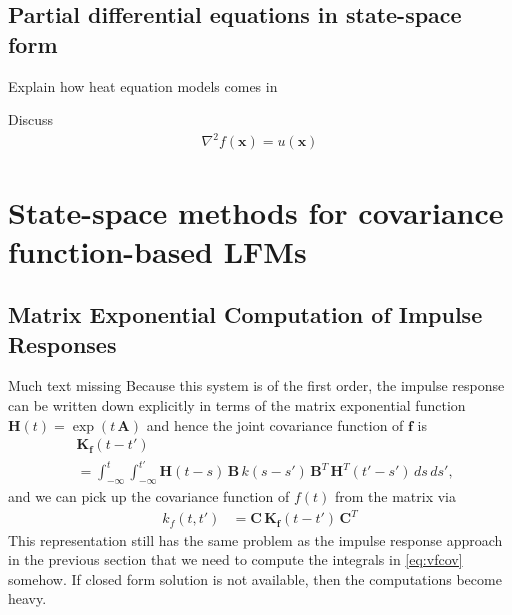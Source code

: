 \documentclass[journal]{IEEEtran}
\newcommand{\simo}[1]{{\color{red}#1}}
\begin{document}
\subsection{Partial differential equations in state-space form}

\simo{Explain how heat equation models comes in}


Discuss
%
\begin{align*}
  \nabla^2 f(\mathbf{x}) = u(\mathbf{x})
\end{align*}


%

\section{State-space methods for covariance function-based LFMs}

\subsection{Matrix Exponential Computation of Impulse Responses}
\simo{Much text missing}
Because this system is of the first order, the impulse response can be written down explicitly in terms of the matrix exponential function $\mathbf{H}(t) = \exp(t \, \mathbf{A})$ and hence the joint covariance function of $\mathbf{f}$ is
%
\begin{equation}
\begin{split}
  &\mathbf{K}_\mathbf{f}(t - t')
  \\ &
  =
  \int_{-\infty}^{t} \int_{-\infty}^{t'}
  \mathbf{H}(t - s) \, \mathbf{B} \, k(s - s') \,
  \mathbf{B}^T \, \mathbf{H}^T(t' - s') \, ds \, ds',
\end{split}
\label{eq:vfcov}
\end{equation}
%
and we can pick up the covariance function of $f(t)$ from the matrix via
%
\begin{equation}
\begin{split}
  k_f(t,t') &=
  \mathbf{C} \, \mathbf{K}_\mathbf{f}(t - t') \, \mathbf{C}^T
\end{split}
\label{eq:fcov2}
\end{equation}
%
This representation still has the same problem as the impulse response approach in the previous section that we need to compute the integrals in \eqref{eq:vfcov} somehow. If closed form solution is not available, then the computations become heavy.
\end{document}
